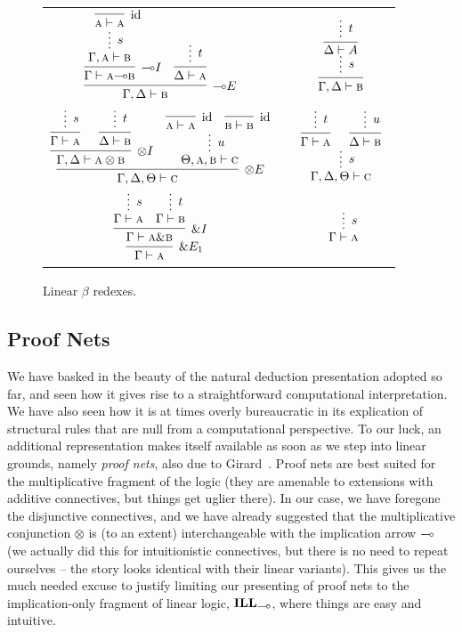 \begin{figure}
	\centering
	\begin{tabularx}{0.95\textwidth}{@{}ccc@{}}
	$\infer[\li E]{\Gamma, \Delta \vdash \prop{b}}{
	\infer[\li I]{\Gamma \vdash \prop{a} \li \prop{b}}{
		\infer*[s]{\Gamma, \prop{a} \vdash \prop{b}}{
				\infer[\Ax]{\prop{a} \vdash \prop{a}}{} 
			}
		}
		&
		\infer{\Delta \vdash \prop{a}}{
			\infer*[t]{}{}
		}
	}$
	&
	\raisebox{20pt}{$\implies$}
	&
	$ 
	\infer[]{\Gamma, \Delta \vdash \prop{b}}{
		\infer*[s]{}{
		\infer[]{\Delta \vdash A}{
			\infer*[t]{}{}
		}}
	}
	$\\[\smallsep]
	$
	\infer[\otimes E]{\Gamma, \Delta, \Theta \vdash \prop{c}}{
		\infer[\otimes I]{\Gamma, \Delta \vdash \prop{a} \otimes \prop{b}}{
			\infer[]{\Gamma \vdash \prop{a}}{\infer*[s]{}{}}
			&
			\infer[]{\Delta \vdash \prop{b}}{\infer*[t]{}{}}
		}		
		&
		\infer*[u]{\Theta, \prop{a}, \prop{b} \vdash \prop{c}}{
			\infer[\Ax]{\prop{a} \vdash \prop{a}}{}
			& 
			\infer[\Ax]{\prop{b} \vdash \prop{b}}{}
		}
	}
	$
	&
	\raisebox{20pt}{$\implies$}
	&
	$
	\infer*[s]{\Gamma, \Delta, \Theta \vdash \prop{c}}{
		\infer[]{\Gamma \vdash \prop{a}}{
			\infer*[t]{}{}
		}
		&
		\infer[]{\Delta \vdash \prop{b}}{
			\infer*[u]{}{}
		}
	}
	$\\[\smallsep]
	$
	\infer[\with E_1]{\Gamma \vdash \prop{a}}{
		\infer[\with I]{\Gamma \vdash \prop{a} \with \prop{b}}{
			\infer*[s]{\Gamma \vdash \prop{a}}{}
			&
			\infer*[t]{\Gamma \vdash \prop{b}}{}
		}
	}
	$
	&
	\raisebox{10pt}{$\implies$}
	&
	$
	\infer*[s]{\Gamma \vdash \prop{a}}{}
	$
	\end{tabularx}
	\caption{Linear $\beta$ redexes.}
	\label{figure:linear_proof_reductions}
\end{figure}


\subsection{Proof Nets}
\label{subsection:proofnets}
We have basked in the beauty of the natural deduction presentation adopted so far, and seen how it gives rise to a straightforward computational interpretation.
We have also seen how it is at times overly bureaucratic in its explication of structural rules that are null from a computational perspective.
To our luck, an additional representation makes itself available as soon as we step into linear grounds, namely \textit{proof nets}, also due to Girard~\cite{girard1987linear}. 
Proof nets are best suited for the multiplicative fragment of the logic (they are amenable to extensions with additive connectives, but things get uglier there).
In our case, we have foregone the disjunctive connectives, and we have already suggested that the multiplicative conjunction $\otimes$ is (to an extent) interchangeable with the implication arrow $\li$ (we actually did this for intuitionistic connectives, but there is no need to repeat ourselves -- the story looks identical with their linear variants).
This gives us the much needed excuse to justify limiting our presenting of proof nets to the implication-only fragment of linear logic, $\ILL_{\li}$, where things are easy and intuitive.

